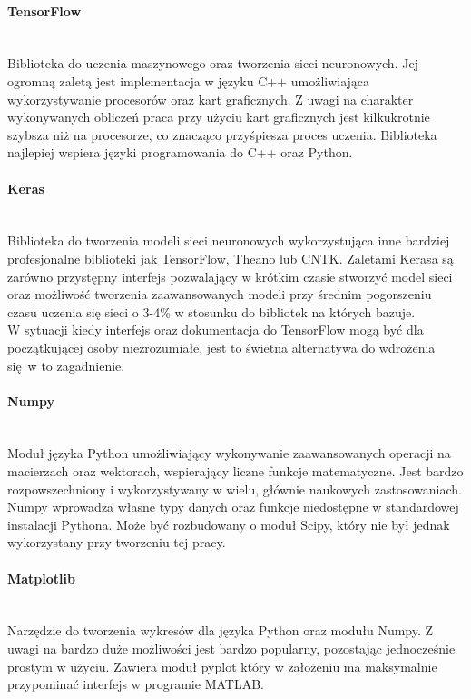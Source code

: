 \paragraph{TensorFlow} \mbox{}\\
Biblioteka do uczenia maszynowego oraz tworzenia sieci neuronowych. Jej ogromną
zaletą jest implementacja w języku C++ umożliwiająca wykorzystywanie procesorów oraz
kart graficznych. Z uwagi na charakter wykonywanych obliczeń praca przy użyciu
kart graficznych jest kilkukrotnie szybsza niż na procesorze, co znacząco przyśpiesza
proces uczenia. Biblioteka najlepiej wspiera języki programowania do C++ oraz Python.

\paragraph{Keras} \mbox{}\\
Biblioteka do tworzenia modeli sieci neuronowych wykorzystująca inne bardziej
profesjonalne biblioteki jak TensorFlow, Theano lub CNTK. Zaletami Kerasa są
zarówno przystępny interfejs pozwalający w krótkim czasie stworzyć model sieci
oraz możliwość tworzenia zaawansowanych modeli przy średnim pogorszeniu czasu
uczenia się sieci o 3-4\% w stosunku do bibliotek na których bazuje.\\
W sytuacji kiedy interfejs oraz dokumentacja do TensorFlow mogą być dla początkującej
osoby niezrozumiałe, jest to świetna alternatywa do wdrożenia się w to zagadnienie.

\paragraph{Numpy} \mbox{}\\
Moduł języka Python umożliwiający wykonywanie zaawansowanych operacji na macierzach
oraz wektorach, wspierający liczne funkcje matematyczne. Jest bardzo rozpowszechniony
i wykorzystywany w wielu, głównie naukowych zastosowaniach. Numpy wprowadza własne
typy danych oraz funkcje niedostępne w standardowej instalacji Pythona. Może być
rozbudowany o moduł Scipy, który nie był jednak wykorzystany przy tworzeniu tej pracy.

\paragraph{Matplotlib} \mbox{}\\
Narzędzie do tworzenia wykresów dla języka Python oraz modułu Numpy. Z uwagi na
bardzo duże możliwości jest bardzo popularny, pozostając jednocześnie prostym w
użyciu. Zawiera moduł pyplot który w założeniu ma maksymalnie przypominać interfejs
w programie MATLAB.

